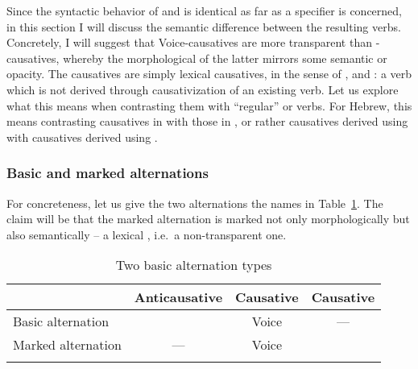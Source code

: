 \begin{exe}
\begin{xlist}
\begin{xlist}
\begin{exe}
\begin{exe}
\begin{xlist}
\begin{exe}
\begin{xlist}
\begin{exe}
\begin{xlist}
\begin{xlist}
\begin{exe}
\begin{xlist}
\begin{exe}
\begin{xlist}
\begin{exe}
\begin{exe}
\begin{exe}
\begin{xlist}
\begin{exe}
\begin{exe}
\begin{xlist}
\begin{xlist}
\begin{exe}
\begin{xlist}
\begin{exe}
\begin{exe}
\begin{exe}
\begin{xlist}
\begin{exe}
\begin{exe}
\begin{xlist}
\begin{exe}
\begin{xlist}
\begin{exe}
\begin{xlist}
\begin{exe}
\begin{xlist}
\begin{exe}
Since the syntactic behavior of  and {\vd} is identical as far as  a specifier is concerned, in this section I will discuss the semantic difference between the resulting  verbs. Concretely, I will suggest that Voice-causatives are more transparent than {\vd}-causatives, whereby the morphological  of the latter mirrors some semantic  or opacity. The {\vd} causatives are simply lexical causatives, in the sense of \cite{fodor70}, \cite{miyagawa98} and \cite{harley08}: a  verb which is not derived through causativization of an existing verb. Let us explore what this means when contrasting them with ``regular''  or  verbs. For Hebrew, this means contrasting causatives in {\tkal} with those in {\thif}, or rather causatives derived using  with causatives derived using {\vd}.

		\subsubsection{Basic and marked alternations}
For concreteness, let us give the two alternations the names in Table~\ref{tab:4-4:alt}. The claim will be that the marked alternation is marked not only morphologically but also semantically -- a lexical , i.e.~a non-transparent one.
 \begin{table}
\begin{tabularx}{\textwidth}{lccc}
 \lsptoprule
	&	Anticausative & Causative & Causative\\\midrule
Basic alternation	& {\vz} & Voice & ---  \\
Marked alternation		&	---	&  Voice & {\vd}\\
\lspbottomrule
 \end{tabularx}
 	\caption{Two basic alternation types}
	\label{tab:4-4:alt}
\end{table}


\end{exe}
\end{xlist}
\end{exe}
\end{xlist}
\end{exe}
\end{xlist}
\end{exe}
\end{xlist}
\end{exe}
\end{exe}
\end{xlist}
\end{exe}
\end{exe}
\end{exe}
\end{xlist}
\end{exe}
\end{xlist}
\end{xlist}
\end{exe}
\end{exe}
\end{xlist}
\end{exe}
\end{exe}
\end{exe}
\end{xlist}
\end{exe}
\end{xlist}
\end{exe}
\end{xlist}
\end{xlist}
\end{exe}
\end{xlist}
\end{exe}
\end{xlist}
\end{exe}
\end{exe}
\end{xlist}
\end{xlist}
\end{exe}
